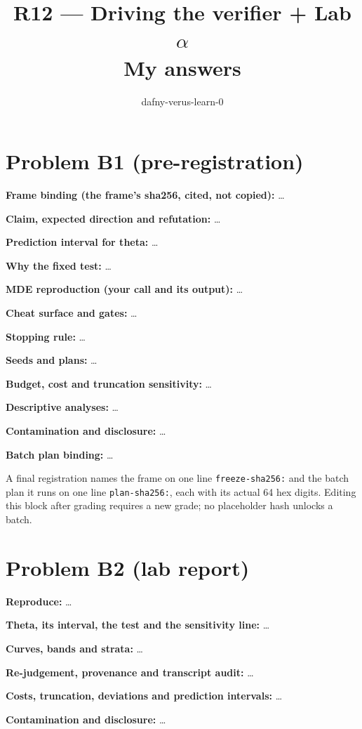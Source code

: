 \documentclass[11pt]{article}
\title{R12 --- Driving the verifier + Lab $\alpha$ \\ \large My answers}
\author{dafny-verus-learn-0}
\date{}
\begin{document}
\maketitle
\sloppy
\section*{Problem B1 (pre-registration)}\label{ans:B1}
\begin{answer}
\textbf{Frame binding (the frame's sha256, cited, not copied):} \dots

\textbf{Claim, expected direction and refutation:} \dots

\textbf{Prediction interval for theta:} \dots

\textbf{Why the fixed test:} \dots

\textbf{MDE reproduction (your call and its output):} \dots

\textbf{Cheat surface and gates:} \dots

\textbf{Stopping rule:} \dots

\textbf{Seeds and plans:} \dots

\textbf{Budget, cost and truncation sensitivity:} \dots

\textbf{Descriptive analyses:} \dots

\textbf{Contamination and disclosure:} \dots

\textbf{Batch plan binding:} \dots

A final registration names the frame on one line \texttt{freeze-sha256:} and the
batch plan it runs on one line \texttt{plan-sha256:}, each with its actual
64 hex digits. Editing this block after grading requires a new grade; no
placeholder hash unlocks a batch.
\end{answer}
\section*{Problem B2 (lab report)}\label{ans:B2}
\begin{answer}
\textbf{Reproduce:} \dots

\textbf{Theta, its interval, the test and the sensitivity line:} \dots

\textbf{Curves, bands and strata:} \dots

\textbf{Re-judgement, provenance and transcript audit:} \dots

\textbf{Costs, truncation, deviations and prediction intervals:} \dots

\textbf{Contamination and disclosure:} \dots
\end{answer}
\end{document}
